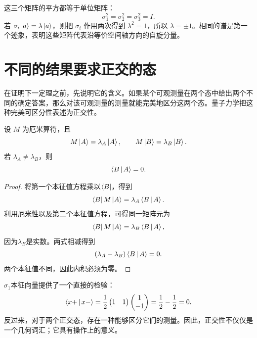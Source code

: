 这三个矩阵的平方都等于单位矩阵：
\begin{equation}
  \sigma_1^2=\sigma_2^2=\sigma_3^2=I.
  \label{eq:l03-pauli-squares}
\end{equation}
若 \(\sigma_i\left\lvert a\right\rangle=\lambda\left\lvert a\right\rangle\)，则把 \(\sigma_i\) 作用两次得到 \(\lambda^2=1\)，所以 \(\lambda=\pm1\)。相同的谱是第一个迹象，表明这些矩阵代表沿等价空间轴方向的自旋分量。

\section{不同的结果要求正交的态}

在证明下一定理之前，先说明它的含义。如果某个可观测量在两个态中给出两个不同的确定答案，那么对该可观测量的测量就能完美地区分这两个态。量子力学把这种完美可区分性表述为正交性。

\begin{theorem}
设 \(M\) 为厄米算符，且
\begin{equation}
  M\left\lvert A\right\rangle=\lambda_A\left\lvert A\right\rangle,
  \qquad
  M\left\lvert B\right\rangle=\lambda_B\left\lvert B\right\rangle.
\end{equation}
若 \(\lambda_A\ne\lambda_B\)，则
\begin{equation}
  \left\langle B\,\middle|\,A\right\rangle=0.
\end{equation}
\end{theorem}

\begin{proof}
将第一个本征值方程乘以\(\left\langle B\right\rvert\)，得到
\begin{equation}
  \left\langle B\right\rvert M\left\lvert A\right\rangle=\lambda_A\left\langle B\,\middle|\,A\right\rangle.
\end{equation}
利用厄米性以及第二个本征值方程，可得同一矩阵元为
\begin{equation}
  \left\langle B\right\rvert M\left\lvert A\right\rangle=\lambda_B\left\langle B\,\middle|\,A\right\rangle,
\end{equation}
因为\(\lambda_B\)是实数。两式相减得到
\begin{equation}
  (\lambda_A-\lambda_B)\left\langle B\,\middle|\,A\right\rangle=0.
\end{equation}
两个本征值不同，因此内积必须为零。
\end{proof}

\(\sigma_1\)本征向量提供了一个直接的检验：
\begin{equation}
  \left\langle x+\,\middle|\,x-\right\rangle
  =
  \frac12
  \begin{pmatrix}1&1\end{pmatrix}
  \begin{pmatrix}1\\-1\end{pmatrix}
  =\frac12-\frac12=0.
\end{equation}
反过来，对于两个正交态，存在一种能够区分它们的测量。因此，正交性不仅仅是一个几何词汇；它具有操作上的意义。

